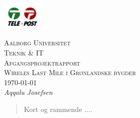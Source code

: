 \documentclass[11pt,a4paper]{report}
\begin{document}
\begin{titlepage}
 \begin{flushright}
  \includegraphics[width=0.15\textwidth]{./telelogo}~\\[1cm] %
 \end{flushright}
 \begin{center}
  \textsc{\LARGE Aalborg Universitet}\\[.5cm]
  \textsc{\Large  Teknik \& IT}\\[.5cm]
  \textsc{\large  Afgangsprojektrapport}\\[3cm]
  \textsc{\huge Wireles Last Mile i Grønlandske bygder}\\[3cm]
  \large \today\\[0.5cm]
  \emph{Aqqalu Josefsen}\\[0.6cm]
 \end{center}
\end{titlepage}

\begin{abstract}
Kort og rammende ....
\end{abstract}

\renewcommand\appendixname{Appendix}
\begin{appendices}
\end{appendices}

\nocite{*}
\printbibliography
\printbibliography[title=Referencer]
\end{document}
